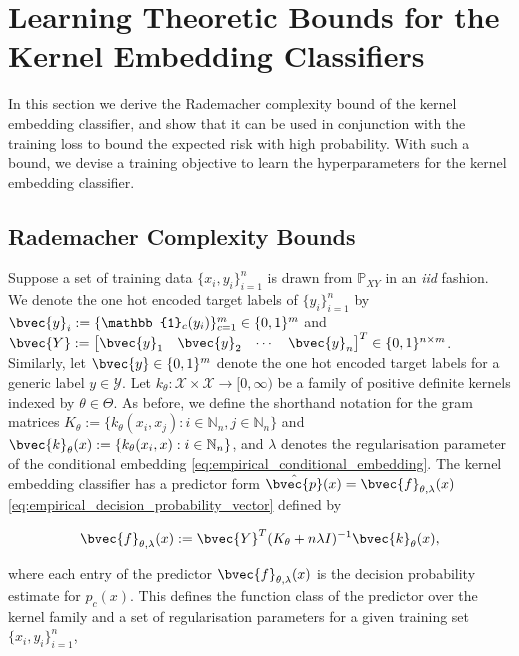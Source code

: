 \documentclass{article}
\begin{document}
\newpage
\section{Learning Theoretic Bounds for the Kernel Embedding Classifiers}
\label{app:learning_theoretic_bounds}

	In this section we derive the Rademacher complexity bound of the kernel embedding classifier, and show that it can be used in conjunction with the training loss to bound the expected risk with high probability. With such a bound, we devise a training objective to learn the hyperparameters for the kernel embedding classifier.
		
	\subsection{Rademacher Complexity Bounds}
	\label{app:rademacher_complexity_theorems}

		Suppose a set of training data $\{x_{i}, y_{i}\}_{i = 1}^{n}$ is drawn from $\mathbb{P}_{X Y}$ in an \textit{iid} fashion. We denote the one hot encoded target labels of $\{y_{i}\}_{i = 1}^{n}$ by $\bvec{y}_{i} := \{\mathbb{1}_{c}(y_{i})\}_{c = 1}^{m} \in \{0, 1\}^{m}$ and $\bvec{Y} := \begin{bmatrix} \bvec{y}_{1} & \bvec{y}_{2} & \cdots & \bvec{y}_{n} \end{bmatrix}^{T} \in \{0, 1\}^{n \times m}$. Similarly, let $\bvec{y} \in \{0, 1\}^{m}$ denote the one hot encoded target labels for a generic label $y \in \mathcal{Y}$. Let $k_{\theta} : \mathcal{X} \times \mathcal{X} \to [0, \infty)$ be a family of positive definite kernels indexed by $\theta \in \Theta$. As before, we define the shorthand notation for the gram matrices $K_{\theta} := \{k_{\theta}(x_{i}, x_{j}) : i \in \mathbb{N}_{n}, j \in \mathbb{N}_{n}\}$ and $\bvec{k}_{\theta}(x) := \{k_{\theta}(x_{i}, x) : i \in \mathbb{N}_{n}\}$, and $\lambda$ denotes the regularisation parameter of the conditional embedding \eqref{eq:empirical_conditional_embedding}. The kernel embedding classifier has a predictor form $\hat{\bvec{p}}(x) = \bvec{f}_{\theta, \lambda}(x)$ \eqref{eq:empirical_decision_probability_vector} defined by
	
		\begin{equation}
			\bvec{f}_{\theta, \lambda}(x) := \bvec{Y}^{T} (K_{\theta} + n \lambda I)^{-1} \bvec{k}_{\theta}(x),
		\label{eq:predictor}
		\end{equation}
		
		where each entry of the predictor $\bvec{f}_{\theta, \lambda}(x)$ is the decision probability estimate for $p_{c}(x)$. This defines the function class of the predictor over the kernel family and a set of regularisation parameters for a given training set $\{x_{i}, y_{i}\}_{i = 1}^{n}$,
		
\end{document}
